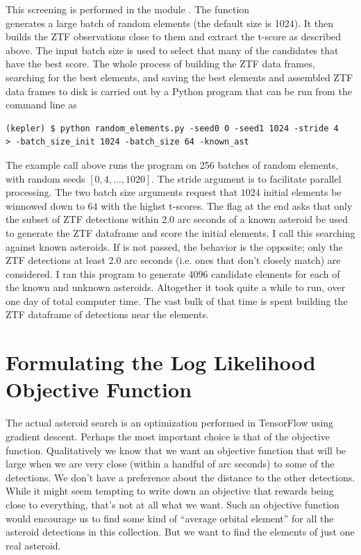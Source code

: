 This screening is performed in the module .
The function \\
 generates a large batch of random elements (the default size is 1024).
It then builds the ZTF observations close to them and extract the t-score as described above.
The input batch size is used to select that many of the candidates that have the best score.
The whole process of building the ZTF data frames, searching for the best elements,
and saving the best elements and assembled ZTF data frames to disk is carried out by a Python program that can be run from the command line as
\begin{lstlisting}[style=CodeSnippet]
(kepler) $ python random_elements.py -seed0 0 -seed1 1024 -stride 4 
> -batch_size_init 1024 -batch_size 64 -known_ast
\end{lstlisting}
The example call above runs the program on 256 batches of random elements, with random seeds $[0, 4, \ldots, 1020]$.
The stride argument is to facilitate parallel processing.
The two batch size arguments request that $1024$ initial elements be winnowed down to $64$ with the highst t-scores.
The flag  at the end asks that only the subset of ZTF detections within 2.0 arc seconds of a known asteroid be used 
to generate the ZTF dataframe and score the initial elements.
I call this searching against known asteroids.
If  is not passed, the behavior is the opposite; only the ZTF detections at least 2.0 arc seconds (i.e. ones that don't closely match) are considered.
I ran this program to generate 4096 candidate elements for each of the known and unknown asteroids.
Altogether it took quite a while to run, over one day of total computer time.
The vast bulk of that time is spent building the ZTF dataframe of detections near the elements.

\section{Formulating the Log Likelihood Objective Function}
\label{section_log_likelihood}
The actual asteroid search is an optimization performed in TensorFlow using gradient descent.
Perhaps the most important choice is that of the objective function.
Qualitatively we know that we want an objective function that will be large when we are very close 
(within a handful of arc seconds) to some of the detections.
We don't have a preference about the distance to the other detections.
While it might seem tempting to write down an objective that rewards being close to everything, that's not at all what we want.
Such an objective function would encourage us to find some kind of ``average orbital element'' for all the asteroid detections  in this collection.
But we want to find the elements of just one real asteroid.

